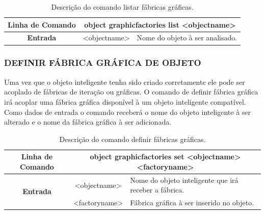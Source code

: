 \documentclass[a4paper,12pt]{monografia}
\theoremstyle{plain}
\theoremstyle{definition}
\theoremstyle{remark}
\begin{document}
\begin{center}
	\begin{table}[!htbp]
		\begin{tabular}{|c|c|m{}|}
			\hline
			\textbf{Linha de Comando} & \multicolumn{2}{c|}{object graphic\underline{\space\space}factories list <object\underline{\space\space}name>} \\
			\hline
			\textbf{Entrada} & <object\underline{\space\space}name> & Nome do objeto à ser analisado. \\
			\hline
		\end{tabular}
		\caption{Descrição do comando listar fábricas gráficas.}
		\label{tab:graphic_factories_list}
	\end{table}
\end{center}

\subsubsection{DEFINIR FÁBRICA GRÁFICA DE OBJETO}\label{sec:graphic_factories_set}

Uma vez que o objeto inteligente tenha sido criado corretamente ele pode ser acoplado de fábricas de iteração ou gráficas. O comando de definir fábrica gráfica irá acoplar uma fábrica gráfica disponível à um objeto inteligente compatível. Como dados de entrada o comando receberá o nome do objeto inteligente à ser alterado e o nome da fábrica gráfica à ser adicionada.

\begin{center}
	\begin{table}[!htbp]
		\begin{tabular}{|c|c|m{}|}
			\hline
			\textbf{Linha de Comando} & \multicolumn{2}{c|}{object graphic\underline{\space\space}factories set <object\underline{\space\space}name> <factory\underline{\space\space}name>} \\
			\hline
			\multirow{2}{*}{\textbf{Entrada}} & <object\underline{\space\space}name> & Nome do objeto inteligente que irá receber a fábrica. \\
			& <factory\underline{\space\space}name> & Fábrica gráfica à ser inserido no objeto. \\
			\hline
		\end{tabular}
		\caption{Descrição do comando definir fábricas gráficas.}
		\label{tab:graphic_factories_set}
	\end{table}
\end{center}
\end{document}
